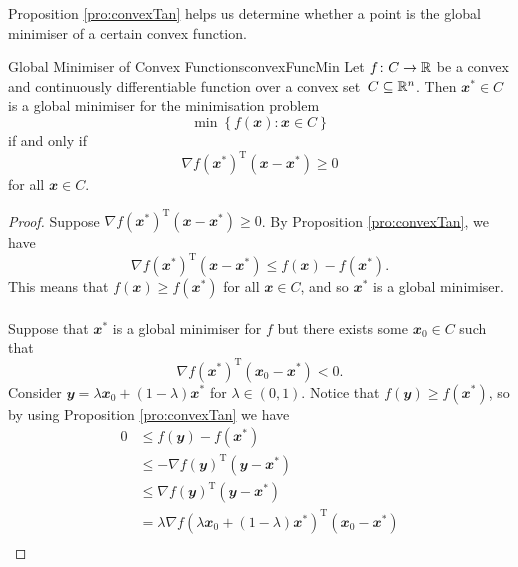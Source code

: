 \documentclass[math, code]{amznotes}
\theoremstyle{remark}
\begin{document}
Proposition \ref{pro:convexTan} helps us determine whether a point is the global minimiser of a certain convex function.
\begin{thmbox}{Global Minimiser of Convex Functions}{convexFuncMin}
    Let $f \colon C \to \mathbb{R}$ be a convex and continuously differentiable function over a convex set~$C \subseteq \mathbb{R}^n$. Then $\mathbfit{x}^* \in C$ is a global minimiser for the minimisation problem 
    \begin{displaymath}
        \min\left\{f(\mathbfit{x}) \colon \mathbfit{x} \in C\right\}
    \end{displaymath}
    if and only if
    \begin{equation*}
        \nabla f(\mathbfit{x}^*)^{\mathrm{T}}(\mathbfit{x} - \mathbfit{x}^*) \geq 0
    \end{equation*}
    for all $\mathbfit{x} \in C$.
    \tcblower   
    \begin{proof}
        Suppose $\nabla f(\mathbfit{x}^*)^{\mathrm{T}}(\mathbfit{x} - \mathbfit{x}^*) \geq 0$. By Proposition \ref{pro:convexTan}, we have 
        \begin{equation*}
            \nabla f(\mathbfit{x}^*)^{\mathrm{T}}(\mathbfit{x} - \mathbfit{x}^*) \leq f(\mathbfit{x}) - f(\mathbfit{x}^*).
        \end{equation*}
        This means that $f(\mathbfit{x}) \geq f(\mathbfit{x}^*)$ for all $\mathbfit{x} \in C$, and so $\mathbfit{x}^*$ is a global minimiser.
        \\\\
        Suppose that $\mathbfit{x}^*$ is a global minimiser for $f$ but there exists some $\mathbfit{x}_0 \in C$ such that
        \begin{equation*}
            \nabla f(\mathbfit{x}^*)^{\mathrm{T}}(\mathbfit{x}_0 - \mathbfit{x}^*) < 0.
        \end{equation*}
        Consider $\mathbfit{y} = \lambda\mathbfit{x}_0 + (1 - \lambda)\mathbfit{x}^*$ for $\lambda \in (0, 1)$. Notice that $f(\mathbfit{y}) \geq f(\mathbfit{x}^*)$, so by using Proposition \ref{pro:convexTan} we have
        \begin{align*}
            0 & \leq f(\mathbfit{y}) - f(\mathbfit{x}^*) \\
            & \leq -\nabla f(\mathbfit{y})^{\mathrm{T}}(\mathbfit{y - x^*}) \\
            & \leq \nabla f(\mathbfit{y})^{\mathrm{T}}(\mathbfit{y - x^*}) \\
            & = \lambda\nabla f\left(\lambda\mathbfit{x}_0 + (1 - \lambda)\mathbfit{x}^*\right)^{\mathrm{T}}(\mathbfit{x_0 - x^*}) \\

\end{align*}
\end{proof}
\end{thmbox}
\end{document}
